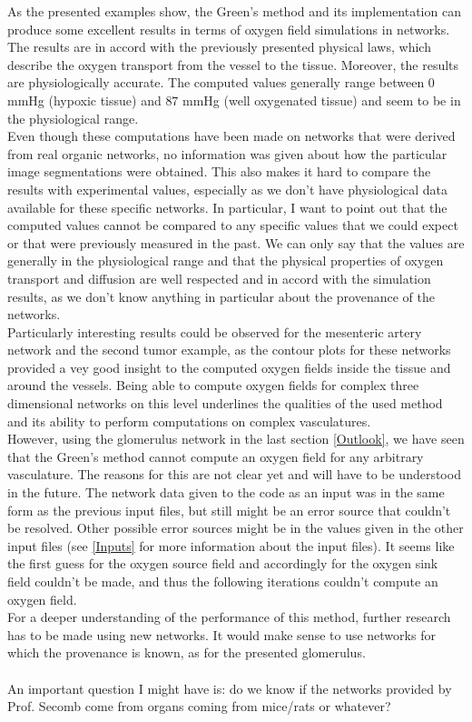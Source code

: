 As the presented examples show, the Green's method and its implementation can produce some excellent results in terms of oxygen field simulations in networks.
\\The results are in accord with the previously presented physical laws, which describe the oxygen transport from the vessel to the tissue. Moreover, the results are physiologically accurate. The computed values generally range between $0$ mmHg (hypoxic tissue) and $87$ mmHg (well oxygenated tissue) and seem to be in the physiological range.
\\Even though these computations have been made on networks that were derived from real organic networks, no information was given about how the particular image segmentations were obtained. This also makes it hard to compare the results with experimental values, especially as we don't have physiological data available for these specific networks. In particular, I want to point out that the computed values cannot be compared to any specific values that we could expect or that were previously measured in the past. We can only say that the values are generally in the physiological range and that the physical properties of oxygen transport and diffusion are well respected and in accord with the simulation results, as we don't know anything in particular about the provenance of the networks.
\\Particularly interesting results could be observed for the mesenteric artery network and the second tumor example, as the contour plots for these networks provided a vey good insight to the computed oxygen fields inside the tissue and around the vessels. Being able to compute oxygen fields for complex three dimensional networks on this level underlines the qualities of the used method and its ability to perform computations on complex vasculatures.
\\However, using the glomerulus network in the last section \ref{Outlook}, we have seen that the Green's method cannot compute an oxygen field for any arbitrary vasculature. The reasons for this are not clear yet and will have to be understood in the future. The network data given to the code as an input was in the same form as the previous input files, but still might be an error source that couldn't be resolved. Other possible error sources might be in the values given in the other input files (see \ref{Inputs} for more information about the input files). It seems like the first guess for the oxygen source field and accordingly for the oxygen sink field couldn't be made, and thus the following iterations couldn't compute an oxygen field.
\\For a deeper understanding of the performance of this method, further research has to be made using new networks. It would make sense to use networks for which the provenance is known, as for the presented glomerulus.\\
\\{\color{red} An important question I might have is: do we know if the networks provided by Prof. Secomb come from organs coming from mice/rats or whatever?}

